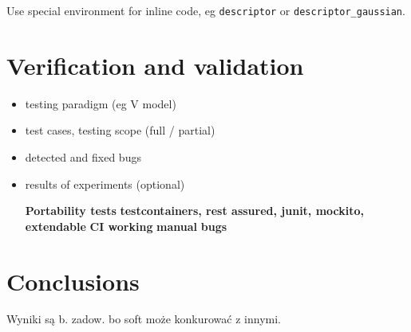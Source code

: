 \documentclass[a4paper,twoside,12pt]{book}
\newcounter{PagesWithoutNumbers}
\begin{document}
Use special environment for inline code, eg \lstinline|descriptor| or \lstinline|descriptor_gaussian|.




\chapter{Verification and validation}
\begin{itemize}
\item testing paradigm (eg V model)
\item test cases, testing scope (full / partial)
\item detected and fixed bugs
\item results of experiments (optional)

\textbf{Portability tests}
\textbf{testcontainers, rest assured, junit, mockito, extendable}
\textbf{CI working}
\textbf{manual}
\textbf{bugs}
\end{itemize}

 
 

\chapter{Conclusions}

Wyniki są b. zadow. bo soft może konkurować z innymi.




\backmatter
{}
\setcounter{page}{\value{PagesWithoutNumbers}}

\pagestyle{onlyPageNumbers}

\printbibliography           %

\end{document}
